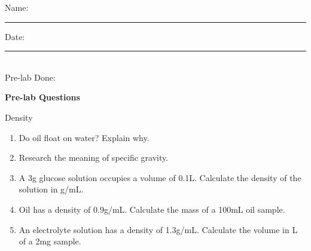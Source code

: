 \documentclass[main.tex]{subfiles}
\begin{document}
\newpage
\setdoublesep{0.35700 em}  %
\setatomsep{1.78500 em}    %
\setbondoffset{0.18265 em} %
\newcommand{\bondwidth}{0.06642 em} %
\setbondstyle{line width = \bondwidth}

\begin{fullwidth}





\begin{multicols}{2}
\begin{tcolorbox}[enhanced jigsaw,breakable,size=title,
colback=mybrown!05,colframe=black,fonttitle=\bfseries,
title=STUDENT INFO,pad at break=1mm, break at=15cm/0pt ]
\vspace{0.2cm}
\noindent Name: \rule{5cm}{0.4pt}Date:\rule{1cm}{0.4pt}\\
Pre-lab Done: \quad
\end{tcolorbox}
\end{multicols}
\hfill
\vspace{0.2cm}
\begin{center}
{\large \bfseries 
Pre-lab Questions 
\par
\Huge
Density
\\[5pt] \par}
\vspace{0.2cm}
\end{center}
\par
\noindent
\uline{  \hfill \normalsize \hfill       }

\begin{enumerate}
\item Do oil float on water? Explain why.
\vspace{3cm}

\item Research the meaning of specific gravity.
\vspace{3cm}

\item A 3g glucose solution occupies a volume of 0.1L. Calculate the density of the solution in g/mL.
\vspace{3cm}


\item Oil has a density of 0.9g/mL.  Calculate the mass of a 100mL oil sample.
\vspace{3cm}


\item An electrolyte solution has a density of 1.3g/mL.  Calculate the volume in L of a 2mg  sample.
\vspace{3cm}




\end{enumerate}
\end{fullwidth}
\end{document}
